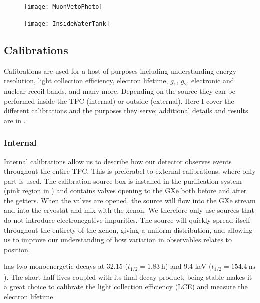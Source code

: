\begin{figure}
\centering
\texttt{[image: MuonVetoPhoto]}
\label{fig:xenon1t_water_shield_photo}
\end{figure}

\begin{figure}
\centering
\texttt{[image: InsideWaterTank]}
\label{fig:xenon1t_water_shield_interior}
\end{figure}



\subsection{Calibrations}
\label{subsec:xenon1t_calibrations}
Calibrations are used for a host of purposes including understanding energy resolution, light collection efficiency, electron lifetime,
$g_1$, $g_2$, electronic and nuclear recoil bands, and many more.  Depending on the source they can be performed inside the TPC (internal) or
outside (external).  Here I cover the different calibrations and the purposes they serve; additional details and results are in
.


\subsubsection{Internal}
\label{subsubsec:xenon1t_calibrations_internal}
Internal calibrations allow us to describe how our detector observes events throughout the entire TPC.  This is preferabel to external
calibrations, where only part is used.  The calibration source box is installed in the purification system (pink region in
) and contains valves opening to the GXe both before and after the getters.  When the valves are opened,
the source will flow into the GXe stream and into the cryostat and mix with the xenon.  We therefore only use sources that do not introduce
electronegative impurities.  The source will quickly spread itself throughout the entirety of the xenon, giving a uniform distribution,
and allowing us to improve our understanding of how variation in observables relates to position.

\kryptonmeta has two monoenergetic decays at 32.15 ($t_{1/2} = 1.83\ \mathrm{h}$) and 9.4 keV ($t_{1/2} = 154.4\ \mathrm{ns}$).  The short
half-lives coupled with its final decay product,  being stable makes it a great choice to calibrate the light collection
efficiency (LCE) and measure the electron lifetime.

